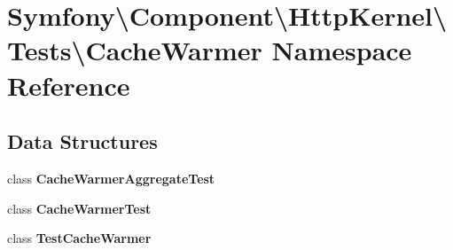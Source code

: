 \section{Symfony\textbackslash{}Component\textbackslash{}Http\+Kernel\textbackslash{}Tests\textbackslash{}Cache\+Warmer Namespace Reference}
\label{namespace_symfony_1_1_component_1_1_http_kernel_1_1_tests_1_1_cache_warmer}
\subsection*{Data Structures}
\begin{DoxyCompactItemize}
\item 
class {\bf Cache\+Warmer\+Aggregate\+Test}
\item 
class {\bf Cache\+Warmer\+Test}
\item 
class {\bf Test\+Cache\+Warmer}
\end{DoxyCompactItemize}
